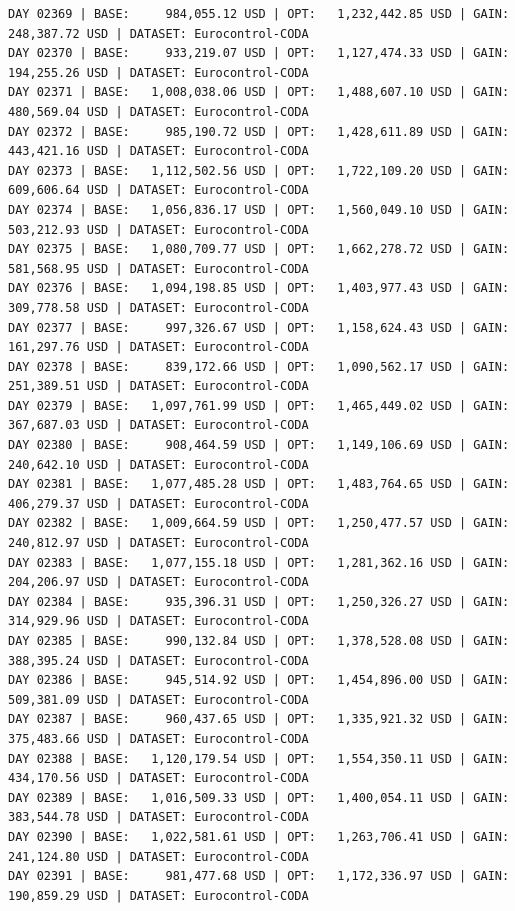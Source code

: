 \documentclass[11pt,a4paper]{article}
\begin{document}
\begin{verbatim}
DAY 02369 | BASE:     984,055.12 USD | OPT:   1,232,442.85 USD | GAIN: 248,387.72 USD | DATASET: Eurocontrol-CODA
DAY 02370 | BASE:     933,219.07 USD | OPT:   1,127,474.33 USD | GAIN: 194,255.26 USD | DATASET: Eurocontrol-CODA
DAY 02371 | BASE:   1,008,038.06 USD | OPT:   1,488,607.10 USD | GAIN: 480,569.04 USD | DATASET: Eurocontrol-CODA
DAY 02372 | BASE:     985,190.72 USD | OPT:   1,428,611.89 USD | GAIN: 443,421.16 USD | DATASET: Eurocontrol-CODA
DAY 02373 | BASE:   1,112,502.56 USD | OPT:   1,722,109.20 USD | GAIN: 609,606.64 USD | DATASET: Eurocontrol-CODA
DAY 02374 | BASE:   1,056,836.17 USD | OPT:   1,560,049.10 USD | GAIN: 503,212.93 USD | DATASET: Eurocontrol-CODA
DAY 02375 | BASE:   1,080,709.77 USD | OPT:   1,662,278.72 USD | GAIN: 581,568.95 USD | DATASET: Eurocontrol-CODA
DAY 02376 | BASE:   1,094,198.85 USD | OPT:   1,403,977.43 USD | GAIN: 309,778.58 USD | DATASET: Eurocontrol-CODA
DAY 02377 | BASE:     997,326.67 USD | OPT:   1,158,624.43 USD | GAIN: 161,297.76 USD | DATASET: Eurocontrol-CODA
DAY 02378 | BASE:     839,172.66 USD | OPT:   1,090,562.17 USD | GAIN: 251,389.51 USD | DATASET: Eurocontrol-CODA
DAY 02379 | BASE:   1,097,761.99 USD | OPT:   1,465,449.02 USD | GAIN: 367,687.03 USD | DATASET: Eurocontrol-CODA
DAY 02380 | BASE:     908,464.59 USD | OPT:   1,149,106.69 USD | GAIN: 240,642.10 USD | DATASET: Eurocontrol-CODA
DAY 02381 | BASE:   1,077,485.28 USD | OPT:   1,483,764.65 USD | GAIN: 406,279.37 USD | DATASET: Eurocontrol-CODA
DAY 02382 | BASE:   1,009,664.59 USD | OPT:   1,250,477.57 USD | GAIN: 240,812.97 USD | DATASET: Eurocontrol-CODA
DAY 02383 | BASE:   1,077,155.18 USD | OPT:   1,281,362.16 USD | GAIN: 204,206.97 USD | DATASET: Eurocontrol-CODA
DAY 02384 | BASE:     935,396.31 USD | OPT:   1,250,326.27 USD | GAIN: 314,929.96 USD | DATASET: Eurocontrol-CODA
DAY 02385 | BASE:     990,132.84 USD | OPT:   1,378,528.08 USD | GAIN: 388,395.24 USD | DATASET: Eurocontrol-CODA
DAY 02386 | BASE:     945,514.92 USD | OPT:   1,454,896.00 USD | GAIN: 509,381.09 USD | DATASET: Eurocontrol-CODA
DAY 02387 | BASE:     960,437.65 USD | OPT:   1,335,921.32 USD | GAIN: 375,483.66 USD | DATASET: Eurocontrol-CODA
DAY 02388 | BASE:   1,120,179.54 USD | OPT:   1,554,350.11 USD | GAIN: 434,170.56 USD | DATASET: Eurocontrol-CODA
DAY 02389 | BASE:   1,016,509.33 USD | OPT:   1,400,054.11 USD | GAIN: 383,544.78 USD | DATASET: Eurocontrol-CODA
DAY 02390 | BASE:   1,022,581.61 USD | OPT:   1,263,706.41 USD | GAIN: 241,124.80 USD | DATASET: Eurocontrol-CODA
DAY 02391 | BASE:     981,477.68 USD | OPT:   1,172,336.97 USD | GAIN: 190,859.29 USD | DATASET: Eurocontrol-CODA

\end{verbatim}
\end{document}
